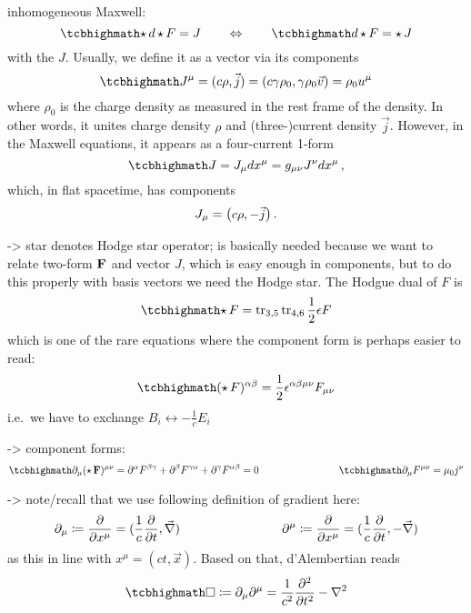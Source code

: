 \documentclass[../relativity_main.tex]{subfiles}
\begin{document}
inhomogeneous Maxwell:
\begin{equation}
	\eqbox{
		\hodge d \hodge F = J
	}
	\qquad \Leftrightarrow \qquad
	\eqbox{
		d \hodge F = \hodge J
	}
\end{equation}
with the  $J$. Usually, we define it as a vector via its components
\begin{equation}
	\eqbox{
		J^\mu = (c \rho, \vec{j}) = (c \gamma \rho_0, \gamma \rho_0 \vec{v}) = \rho_0 u^\mu
	}
\end{equation}
where $\rho_0$ is the charge density as measured in the rest frame of the density. In other words, it unites charge density $\rho$ and (three-)current density $\vec{j}$. However, in the Maxwell equations, it appears as a four-current 1-form
\begin{equation}
	\eqbox{
		J = J_\mu dx^\mu = g_{\mu \nu} J^\nu dx^\mu
	} \, ,
\end{equation}
which, in flat spacetime, has components
\begin{equation*}
	J_\mu = \mqty(c \rho, - \vec{j})
	\, .
\end{equation*}


-> star denotes Hodge star operator; is basically needed because we want to relate two-form $\mathbf{F}$ and vector $J$, which is easy enough in components, but to do this properly with basis vectors we need the Hodge star. The Hodgue dual of $F$ is
\begin{equation}
	\eqbox{
		\hodge F = \tr_{3, 5} \tr_{4, 6} \frac{1}{2} \epsilon F
	}
\end{equation}
which is one of the rare equations where the component form is perhaps easier to read:
\begin{equation}
	\eqbox{
		(\hodge F)^{\alpha \beta} = \frac{1}{2} \epsilon^{\alpha \beta \mu \nu} F_{\mu \nu}
	}
\end{equation}
i.e.~we have to exchange $B_i \leftrightarrow - \frac{1}{c} E_i$


-> component forms:
\begin{equation}
	\eqbox{
		\partial_\mu (\hodge \tensor{F})^{\mu \nu} = \partial^\alpha F^{\beta \gamma} + \partial^\beta F^{\gamma \alpha} + \partial^\gamma F^{\alpha \beta} = 0
	}
	\manyqquad
	\eqbox{
		\partial_\mu F^{\mu \nu} = \mu_0 j^\nu
	}
\end{equation}


-> note/recall that we use following definition of gradient here:
\begin{equation}
	\partial_\mu \coloneqq \pdv{x^\mu} = (\frac{1}{c} \pdv{t}, \vec{\nabla})
	\qquad \qquad \qquad \qquad
	\partial^\mu \coloneqq \pdv{x^\mu} = (\frac{1}{c} \pdv{t}, - \vec{\nabla})
\end{equation}
as this in line with $x^\mu = (c t, \vec{x})$. Based on that, d'Alembertian reads
\begin{equation}
	\eqbox{
		\square \coloneqq \partial_\mu \partial^\mu = \frac{1}{c^2} \pdv[2]{t} - \laplacian
	}
\end{equation}
\end{document}
